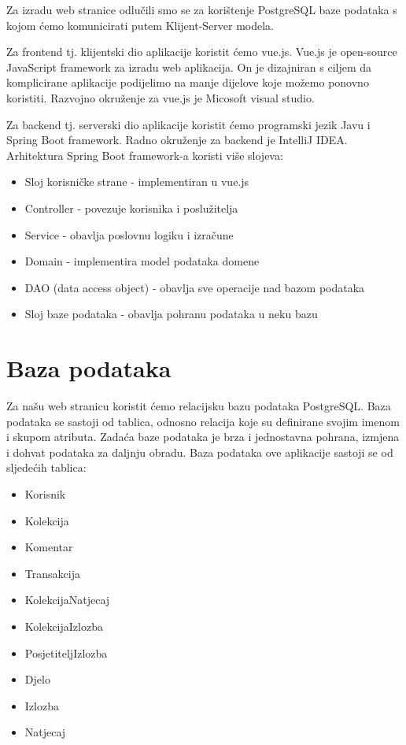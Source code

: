 		Za izradu web stranice odlučili smo se za korištenje PostgreSQL baze podataka s kojom ćemo komunicirati putem Klijent-Server modela.
		
		Za frontend tj. klijentski  dio aplikacije koristit ćemo vue.js. Vue.js je open-source JavaScript framework za izradu web aplikacija. On je dizajniran s ciljem da komplicirane aplikacije podijelimo na manje dijelove koje možemo ponovno koristiti. Razvojno okruženje za vue.js je Micosoft visual studio.
		
		Za backend tj. serverski dio aplikacije koristit ćemo programski jezik Javu i Spring Boot framework. Radno okruženje za backend je IntelliJ IDEA.
		\newline
		Arhitektura Spring Boot framework-a koristi više slojeva:
		
		\begin{itemize}
			\item Sloj korisničke strane - implementiran u vue.js
			\item Controller - povezuje korisnika i poslužitelja
			\item Service - obavlja poslovnu logiku i izračune
			\item Domain - implementira model podataka domene
			\item DAO (data access object) - obavlja sve operacije nad bazom podataka 
			\item Sloj baze podataka - obavlja pohranu podataka u neku bazu
		\end{itemize}

		

				
		\section{Baza podataka}
			
			Za našu web stranicu koristit ćemo relacijsku bazu podataka PostgreSQL. Baza podataka se sastoji od tablica, odnosno relacija koje su definirane svojim imenom i skupom atributa. Zadaća baze podataka je brza i jednostavna pohrana, izmjena i dohvat podataka za daljnju obradu. \newline Baza podataka ove aplikacije sastoji se od sljedećih tablica:
			\begin{itemize}
				\item Korisnik
				\item Kolekcija
				\item Komentar
				\item Transakcija
				\item KolekcijaNatjecaj
				\item KolekcijaIzlozba
				\item PosjetiteljIzlozba
				\item Djelo
				\item Izlozba
				\item Natjecaj
				
			\end{itemize}
		
